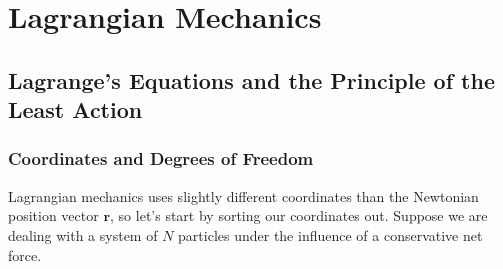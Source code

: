 \documentclass[11pt, a4paper]{article}
\begin{document}
\fi

\newpage 
\section{Lagrangian Mechanics}

\subsection{Lagrange's Equations and the Principle of the Least Action} \label{ssec:lag:lag_and_least_action}

\subsubsection{Coordinates and Degrees of Freedom}
Lagrangian mechanics uses slightly different coordinates than the Newtonian position vector $ \bm{r} $, so let's start by sorting our coordinates out. Suppose we are dealing with a system of $ N $ particles under the influence of a conservative net force.
\end{document}
